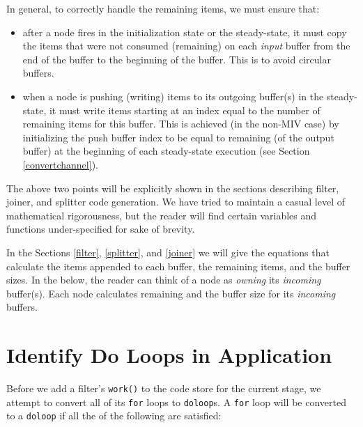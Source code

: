 \documentclass[10pt, letterpaper, onecolumn]{article}
\begin{document}
In general, to correctly handle the remaining items, we must ensure
that:
\begin{itemize}
\item after a node fires in the initialization state or the
  steady-state, it must copy the items that were not consumed
  (remaining) on each {\it input} buffer from the end of the buffer to the
  beginning of the buffer.  This is to avoid circular buffers.
\item when a node is pushing (writing) items to its outgoing buffer(s)
  in the steady-state, it must write items starting at an index equal
  to the number of remaining items for this buffer.  This is achieved
  (in the non-MIV case) by initializing the push buffer index to be
  equal to remaining (of the output buffer) at the beginning of each
  steady-state execution (see Section \ref{convertchannel}).
\end{itemize}

The above two points will be explicitly shown in the sections
describing filter, joiner, and splitter code generation.  We have
tried to maintain a casual level of mathematical rigorousness, but the
reader will find certain variables and functions under-specified for
sake of brevity.   

In the Sections \ref{filter}, \ref{splitter}, and \ref{joiner} we will
give the equations that calculate the items appended to each buffer,
the remaining items, and the buffer sizes.  In the below, the reader
can think of a node as {\it owning} its {\it incoming} buffer(s).  Each
node calculates remaining and the buffer size for its {\it incoming}
buffers.

\section{Identify Do Loops in Application}
\label{doloop}
Before we add a filter's {\tt work()} to the code store for the
current stage, we attempt to convert all of its {\tt for} loops to
{\tt doloop}s.  A {\tt for} loop will be converted to a {\tt doloop}
if all the of the following are satisfied:
\end{document}
